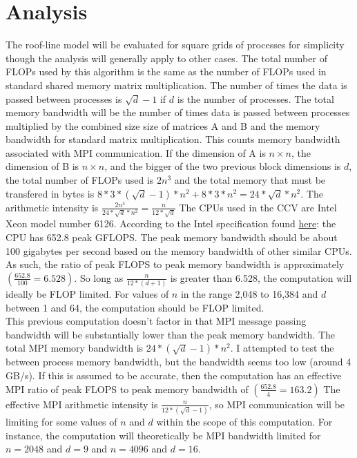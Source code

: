 \documentclass{article}
\begin{document}
\section{Analysis}

The roof-line model will be evaluated for square grids of processes for simplicity though the analysis
will generally apply to other cases.
The total number of FLOPs used by this algorithm is the same as the number of FLOPs used in standard
shared memory matrix multiplication. The number of times the data is passed between processes is
$\sqrt{d} - 1$ if $d$ is the number of processes. The total memory bandwidth will be the number
of times data is passed between processes multiplied by the combined size
size of matrices A and B and the memory bandwidth for standard matrix multiplication. This counts memory
bandwidth associated with MPI communication.
If the dimension of A is $n \times n$, the dimension of B is $n \times n$, and the bigger of the two
previous block dimensions is $d$, the total number of FLOPs
used is $2 n^3$ and the total memory that must be transfered in bytes is 
$ 8 * 3 * (\sqrt{d} - 1) * n^2 + 8 * 3 * n^2 = 24 * \sqrt{d} * n^2$. The arithmetic intensity is 
$\frac{2 n^3}{24 * \sqrt{d} * n^2} = \frac{n}{12 * \sqrt{d}}$ The CPUs used in the CCV are Intel Xeon 
model number 6126. According to the Intel specification found 
\href{https://www.intel.com/content/www/us/en/support/articles/000005755/processors.html}{here}: 
the CPU has 652.8 
peak GFLOPS. The peak memory bandwidth should be about 100 gigabytes per second based on the
memory bandwidth of other similar CPUs. As such, the ratio of peak FLOPS to peak memory bandwidth 
is approximately $(\frac{652.8}{100} = 6.528)$. So long as $\frac{n}{12 * (d + 1)}$ is greater
than 6.528, the computation will ideally be FLOP limited. For values of $n$ in the range
2,048 to 16,384 and $d$ between 1 and 64, the computation should be FLOP limited. \\

This previous computation doesn't factor in that MPI message passing bandwidth will be substantially 
lower than the peak memory bandwidth. The total MPI memory bandwidth is $24 * (\sqrt{d} - 1)  * n^2$. 
I attempted to test the 
between process memory bandwidth, but the bandwidth seems too low (around 4 GB/s). If this 
is assumed to be accurate, then the computation has an effective MPI ratio of peak FLOPS to 
peak memory bandwidth of $(\frac{652.8}{4} = 163.2)$  The effective MPI arithmetic intensity
is $\frac{n}{12 * (\sqrt{d} - 1)}$, so MPI communication will be limiting for some values of $n$ and $d$
within the scope of this computation. For instance, the computation will theoretically be MPI bandwidth
limited for $n = 2048$ and $d = 9$ and $n = 4096$ and $d = 16$.
\end{document}
